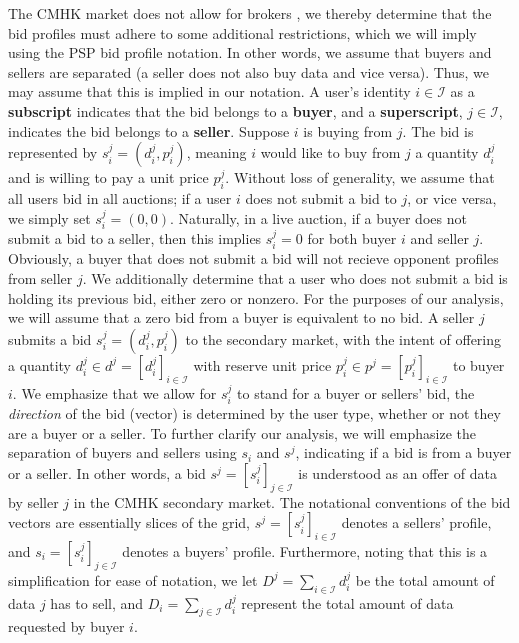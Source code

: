\documentclass[sigconf, anonymous]{acmart}
\newcommand{\mcI}{\mathcal{I}}
\theoremstyle{definition}
\begin{document}
The CMHK market does not allow for brokers \cite{cmhk}, we thereby determine that
the bid profiles must adhere to some additional restrictions, which we will
imply using the PSP bid profile notation. In other words, we assume that buyers and sellers are
separated (a seller does not also buy data and vice versa). Thus, we may assume
that this is implied in our notation.
A user's identity $i \in \mcI$ as a \textbf{subscript} indicates that the bid
belongs to a \textbf{buyer}, and a \textbf{superscript}, $j\in\mcI$, indicates
the bid belongs to a \textbf{seller}.
Suppose $i$ is buying from $j$. The bid is represented by $s_i^j = (d_i^j, p_i^j)$, 
meaning $i$ would like to buy from $j$ a quantity $d^j_i$ and is willing to pay
a unit price $p^j_i$. Without loss of generality, we assume that all users bid in all
auctions; if a user $i$ does not submit a bid to $j$, or vice versa, we simply set $s_i^j =
(0,0)$. Naturally, in a live auction, if a buyer does
not submit a bid to a seller, then this implies $s_i^j = 0$ for both buyer $i$
and seller $j$. Obviously, a buyer that does not submit a bid will not recieve opponent profiles from seller
$j$. We additionally determine that a user who does not submit a bid is holding
its previous bid, either zero or nonzero. For the purposes of our analysis, we will assume that a zero bid from a
buyer is equivalent to no bid.
A seller $j$ submits a bid $s_i^j = (d_i^j, p_i^j)$ to the secondary market,
with the intent of offering a
quantity $d_i^j \in d^j = [d_i^j]_{i\in\mcI}$ 
with reserve unit price $p_i^j \in p^j = [p_i^j]_{i\in\mcI}$ to buyer $i$. We emphasize that we allow for $s_i^j$ to
stand for a buyer or sellers' bid, the \emph{direction} of the bid (vector) is determined
by the user type, whether or not they are  a buyer or a seller. 
To further clarify our analysis, we will emphasize the separation of buyers and
sellers using
$s_i$ and $s^j$, indicating if a bid is from a buyer or a seller.
In other words, a bid $s^j =
[s_i^j]_{j\in\mcI}$ is understood as an offer of data by seller $j$ in the CMHK
secondary market. The notational conventions of the bid vectors are essentially 
slices of the grid, $s^j = [s_i^j]_{i\in\mcI}$ denotes a sellers' profile, and $s_i =
[s_i^j]_{j\in\mcI}$ denotes a buyers' profile. 
Furthermore, noting that this is a simplification for ease of notation, we let $D^j = \sum_{i\in\mcI}
d_i^j$ be the total amount of data $j$ has to sell, and $D_i = \sum_{j\in\mcI}
d_i^j$ represent the
total amount of data requested by buyer $i$. 
\end{document}
